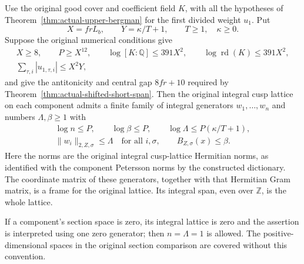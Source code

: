 \begin{theorem}
\label{thm:actual-integral-cusp-frame}
Use the original good cover and coefficient field $K$, with all
the hypotheses of Theorem~\ref{thm:actual-upper-bergman} for the
first divided weight $u_1$.  Put
\[
 X=frL_b,\qquad Y=\kappa/T+1,
 \qquad T\ge1,\quad\kappa\ge0.
\]
Suppose the original numerical conditions give
\begin{gather}
 X\ge8,\qquad P\ge X^{12},\qquad
 \log[K:\mathbb Q]\le391X^2,\qquad
 \log\operatorname{rd}(K)\le391X^2,\label{eq:actual-cusp-frame-size}\\
 \sum_{\tau,i}|u_{1,\tau,i}|\le X^2Y,
 \label{eq:actual-cusp-frame-weight}
\end{gather}
and give the antitonicity and central gap $8fr+10$ required by
Theorem~\ref{thm:actual-shifted-short-span}.
Then the original integral cusp lattice on each component admits
a finite family of integral generators $w_1,\ldots,w_n$ and
numbers $\Lambda,\beta\ge1$ with
\begin{gather}
 \log n\le P,\qquad \log\beta\le P,\qquad
 \log\Lambda\le P(\kappa/T+1),
 \label{eq:actual-cusp-frame-budget}\\
 \|w_i\|_{2,Z,\sigma}\le\Lambda\quad\text{for all }i,\sigma,
 \qquad B_{Z,\sigma}(x)\le\beta.
\end{gather}
Here the norms are the original integral cusp-lattice Hermitian
norms, as identified with the component Petersson norms by the
constructed dictionary.  The coordinate matrix of these generators,
together with that Hermitian Gram matrix, is a frame for the
original lattice.  Its integral span, even over $\mathbb Z$, is
the whole lattice.

If a component's section space is zero, its integral lattice is
zero and the assertion is interpreted using one zero generator;
then $n=\Lambda=1$ is allowed.  The positive-dimensional spaces
in the original section comparison are covered without this
convention.
\end{theorem}

